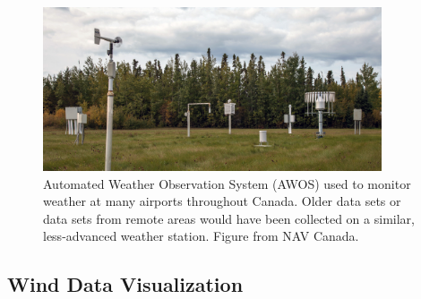 \documentclass{article}
\begin{document}
\begin{figure}[h!]
\centering
\includegraphics[width=10cm]{Images/AWOS.jpg}
\caption{Automated Weather Observation System (AWOS) used to monitor weather at many airports throughout Canada. Older data sets or data sets from remote areas would have been collected on a similar, 
less-advanced weather station. Figure from NAV Canada.}
\label{AWOS}
\end{figure}

\subsection{Wind Data Visualization}\label{Wind_data_visualization}
\end{document}
